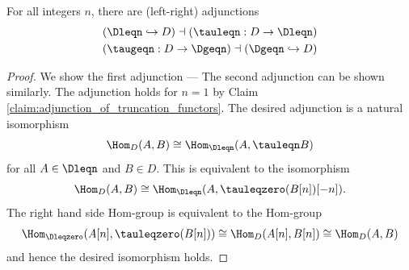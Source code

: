 \begin{lemma} \label{lemma:adjunctions_of_truncation_functors}
    For all integers $n$, there are (left-right) adjunctions
    \begin{align*}
        (\Dleqn \hookrightarrow D) \dashv (\tauleqn: D \to \Dleqn ) \\
        (\taugeqn: D \to \Dgeqn ) \dashv (\Dgeqn \hookrightarrow D) \\
    \end{align*}
    \TODO{}
\end{lemma}

\begin{proof}
    We show the first adjunction --- The second adjunction can be shown similarly. The adjunction holds for $n = 1$ by Claim \ref{claim:adjunction_of_truncation_functors}. The desired adjunction is a natural isomorphism 
    $$\Hom_{D}(A,B) \cong \Hom_{\Dleqn}(A, \tauleqn B)$$
    for all $A \in \Dleqn$ and $B \in D$. This is equivalent to the isomorphism
    $$\Hom_{D}(A,B) \cong \Hom_{\Dleqn}(A, \tauleqzero(B[n])[-n]).$$
    The right hand side Hom-group is equivalent to the Hom-group
    $$\Hom_{\Dleqzero}(A[n], \tauleqzero(B[n])) \cong \Hom_{D}(A[n], B[n]) \cong \Hom_{D}(A,B)$$
    and hence the desired isomorphism holds. 
\end{proof}